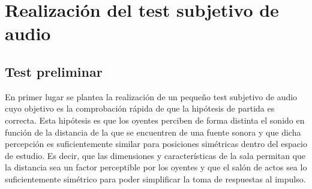\documentclass[11pt,a4paper,twoside]{book}
\author{Víctor de Tejada Molera}
\begin{document}
    \chapter{Realización del test subjetivo de audio}
        \section{Test preliminar}
            En primer lugar se plantea la realización de un pequeño test subjetivo de audio cuyo objetivo es la comprobación rápida de que la hipótesis de partida es correcta. Esta hipótesis es que los oyentes perciben de forma distinta el sonido en función de la distancia de la que se encuentren de una fuente sonora y que dicha percepción es suficientemente similar para posiciones simétricas dentro del espacio de estudio. Es decir, que las dimensiones y características de la sala permitan que la distancia sea un factor perceptible por los oyentes y que el salón de actos sea lo suficientemente simétrico para poder simplificar la toma de respuestas al impulso.
            
\end{document}
